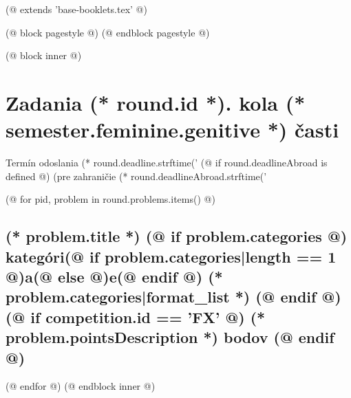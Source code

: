 (@ extends 'base-booklets.tex' @)
 
(@ block pagestyle @)
    \pagestyle{seminar-(* competition.id *)-(* volume.id *)-(* semester.id *)-(* round.id *)-problems}
(@ endblock pagestyle @)

(@ block inner @)
    \section{\texorpdfstring{Zadania (* round.id *). kola (* semester.feminine.genitive *) časti}{Zadania}}
    {
        \centering
        \vspace*{-5mm}
        Termín odoslania (* round.deadline.strftime('%
        (@ if round.deadlineAbroad is defined @) (pre zahraničie (* round.deadlineAbroad.strftime('%
    } 
        
    (@ for pid, problem in round.problems.items() @)%
        \setcounter{volume}{(* volume.number *)}%
        \setcounter{semester}{(* semester.number *)}%
        \setcounter{round}{(* round.number *)}%
        \setcounter{problem}{(* problem.number *)}%
        
        \subsection{%
            \texorpdfstring{%
                \large \textbf{(* problem.title *)}%
                (@ if problem.categories @)%
                    \normalsize \hfill kategóri(@ if problem.categories|length == 1 @)a(@ else @)e(@ endif @) (* problem.categories|format_list *)%
                (@ endif @)
                (@ if competition.id == 'FX' @)
                    \normalsize \hfill \textbf{(* problem.pointsDescription *) bodov}%
                (@ endif @)
            }{%
                (* round.number *).(* problem.number *) (* problem.title *)%
            }%
        }%
    (@ endfor @)
(@ endblock inner @)
